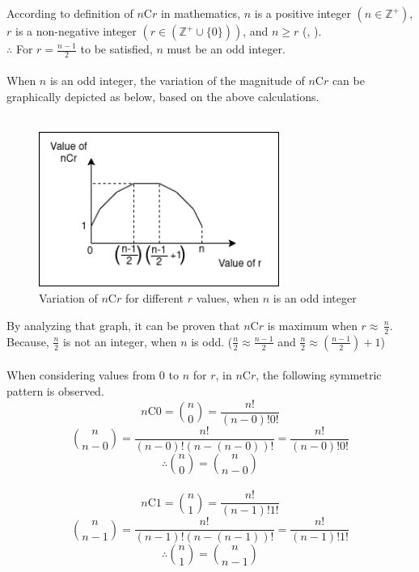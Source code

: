 According to definition of $n \text{C} r$ in mathematics, $n$ is a positive integer $(n \in \mathbb{Z}^+)$, $r$ is a non-negative integer $(r \in (\mathbb{Z}^+ \cup \{0\}))$, and $n \geq r$ (\cite{uow168693}, \cite{newcastle_permutations_combinations}).\\
$\therefore$ For $r = \frac{n-1}{2}$ to be satisfied, $n$ must be an odd integer.\\ \\
When $n$ is an odd integer, the variation of the magnitude of $n \text{C} r$ can be graphically depicted as below, based on the above calculations.\\ \\
\begin{figure}[H]
    \centering
    \includegraphics[width=0.7\textwidth]{./image/ncr_for_odd_n.png}
    \caption{Variation of $n \text{C} r$ for different $r$ values, when $n$ is an odd integer}
    \label{fig:Variation of nCr for different r values, when n is an odd integer}
\end{figure}
By analyzing that graph, it can be proven that $n \text{C} r$ is maximum when $r \approx \, \frac{n}{2}$. Because, $\frac{n}{2}$ is not an integer, when $n$ is odd. ($\frac{n}{2} \approx \frac{n-1}{2}$ and $\frac{n}{2} \approx \left(\frac{n-1}{2}\right) + 1$)\\ \\
When considering values from 0 to $n$ for $r$, in $n \text{C} r$, the following symmetric pattern is observed.\\
\[ n \text{C} 0 = \binom{n}{0} = \frac{n!}{(n-0)!0!} \]
\[ \binom{n}{n-0} = \frac{n!}{(n-0)!(n-(n-0))!} = \frac{n!}{(n-0)!0!} \]
\[ \therefore \binom{n}{0} = \binom{n}{n-0} \]\\

\[ n \text{C} 1 = \binom{n}{1} = \frac{n!}{(n-1)!1!} \]
\[ \binom{n}{n-1} = \frac{n!}{(n-1)!(n-(n-1))!} = \frac{n!}{(n-1)!1!} \]
\[ \therefore \binom{n}{1} = \binom{n}{n-1} \]\\

